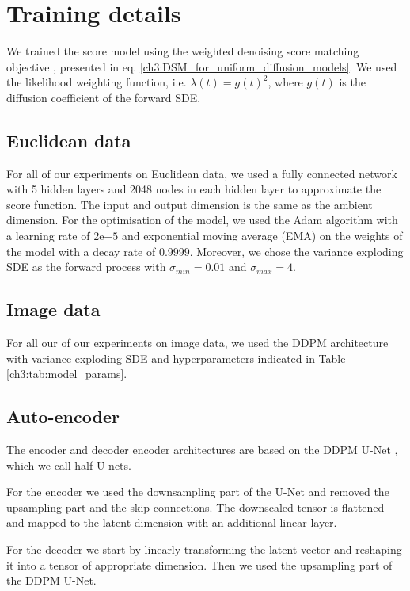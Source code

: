\section{Training details}
\label{ch3:sec:hparams}
We trained the score model using the weighted denoising score matching objective \cite{song2020score}, presented in eq. \ref{ch3:DSM_for_uniform_diffusion_models}. We used the likelihood weighting function, i.e. $\lambda(t)=g(t)^2$, where $g(t)$ is the diffusion coefficient of the forward SDE.

\subsection{Euclidean data}
For all of our experiments on Euclidean data, we used a fully connected network with 5 hidden layers and 2048 nodes in each hidden layer to approximate the score function. The input and output dimension is the same as the ambient dimension. For the optimisation of the model, we used the Adam algorithm with a learning rate of $2\mathrm{e}{-5}$ and exponential moving average (EMA) on the weights of the model with a decay rate of $0.9999$. Moreover, we chose the variance exploding SDE \cite{song2020score} as the forward process with $\sigma_{min}=0.01$ and $\sigma_{max}=4$.

\subsection{ Image data}    
For all our of our experiments on image data, we used the DDPM architecture \cite{ho2020denoising} with variance exploding SDE \cite{song2020score} and hyperparameters indicated in Table \ref{ch3:tab:model_params}.

\subsection{Auto-encoder}
The encoder and decoder encoder architectures are based on the DDPM U-Net \cite{ddpm}, which we call half-U nets.

For the encoder we used the downsampling part of the U-Net and removed the upsampling part and the skip connections. The downscaled tensor is flattened and mapped to the latent dimension with an additional linear layer.

For the decoder we start by linearly transforming the latent vector and reshaping it into a tensor of appropriate dimension. Then we used the upsampling part of the DDPM U-Net.

